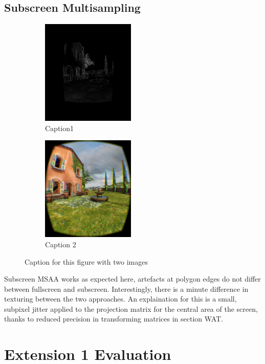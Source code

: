 \documentclass[12pt,a4paper,twoside,openright]{report}
\begin{document}
\subsection{Subscreen Multisampling}

\begin{figure}[tbh]
 
\begin{subfigure}{0.5\textwidth}
\includegraphics[width=0.9\linewidth, height=5cm]{figs/fullscreenminussubscreenmsaa.png} 
\caption{Caption1}
\label{fig:subim1}
\end{subfigure}
\begin{subfigure}{0.5\textwidth}
\includegraphics[width=0.9\linewidth, height=5cm]{figs/noantialiasing.png}
\caption{Caption 2}
\label{fig:subim2}
\end{subfigure}
 
\caption{Caption for this figure with two images}
\label{fig:image2}
\end{figure}

Subscreen MSAA works as expected here, artefacts at polygon edges do not differ between fullscreen and subscreen. Interestingly, there is a minute difference in texturing between the two approaches. An explaination for this is a small, subpixel jitter applied to the projection matrix for the central area of the screen, thanks to reduced precision in transforming matrices in section WAT.

\section{Extension 1 Evaluation}
\end{document}
